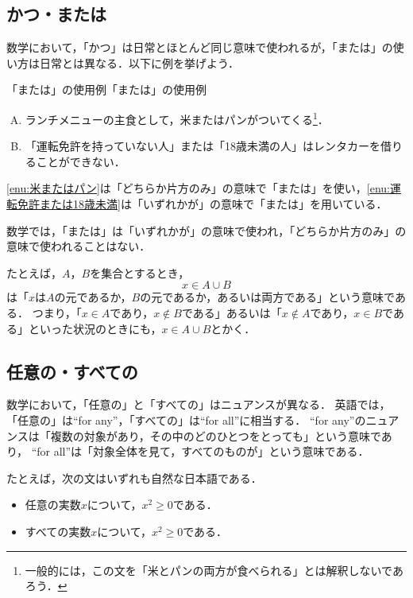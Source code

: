 \subsection{かつ・または}

数学において，「かつ」は日常とほとんど同じ意味で使われるが，「または」の使い方は日常とは異なる．以下に例を挙げよう．

\begin{example}{「または」の使用例}{「または」の使用例}
  \begin{enumerate}[(A)]
    \item ランチメニューの主食として，米またはパンがついてくる\footnote{一般的には，この文を「米とパンの両方が食べられる」とは解釈しないであろう．}．\label{enu:米またはパン}
    \item 「運転免許を持っていない人」または「18歳未満の人」はレンタカーを借りることができない． \label{enu:運転免許または18歳未満}
  \end{enumerate}
  \ref{enu:米またはパン}は「どちらか片方のみ」の意味で「または」を使い，\ref{enu:運転免許または18歳未満}は「いずれかが」の意味で「または」を用いている．
\end{example}

数学では，「または」は「いずれかが」の意味で使われ，「どちらか片方のみ」の意味で使われることはない．

たとえば，$A$，$B$を集合とするとき，
\[
  x \in A \cup B
\]
は「$x$は$A$の元であるか，$B$の元であるか，あるいは両方である」という意味である．
つまり，「$ x \in A$であり，$x \notin  B$である」あるいは「$ x \notin A$であり，$x \in B$である」といった状況のときにも，$x \in A \cup B$とかく．

\subsection{任意の・すべての}

数学において，「任意の」と「すべての」はニュアンスが異なる．
英語では，「任意の」は``for any''，「すべての」は``for all''に相当する．
``for any''のニュアンスは「複数の対象があり，その中のどのひとつをとっても」という意味であり，
``for all''は「対象全体を見て，すべてのものが」という意味である．

たとえば，次の文はいずれも自然な日本語である．
\begin{itemize}
  \item 任意の実数$x$について，$x^2\ge0$である．
  \item すべての実数$x$について，$x^2\ge0$である．
\end{itemize}

